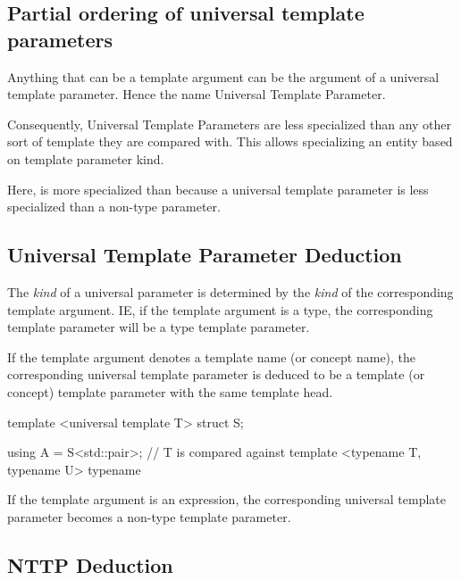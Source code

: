 \documentclass{wg21}
\begin{document}
\subsection{Partial ordering of universal template parameters}

Anything that can be a template argument can be the argument of a universal template parameter. Hence the name Universal Template Parameter.

Consequently, Universal Template Parameters are less specialized than any other sort of template they are compared with.
This allows specializing an entity based on template parameter kind.


Here,  is more specialized than  because a universal template parameter is less specialized than a non-type parameter.

\subsection{Universal Template Parameter Deduction}

The \emph{kind} of a universal parameter is determined by the \emph{kind} of the corresponding template argument.
IE, if the template argument is a type, the corresponding template parameter will be a type template parameter.

If the template argument denotes a template name (or concept name), the corresponding universal template parameter
is deduced to be a template (or concept) template parameter with the same template head.

\begin{colorblock}
template <universal template T>
struct S;

using A = S<std::pair>; // T is compared against template <typename T, typename U> typename
\end{colorblock}

If the template argument is an expression, the corresponding universal template parameter becomes a non-type template parameter.

\subsection{NTTP Deduction}
\end{document}

